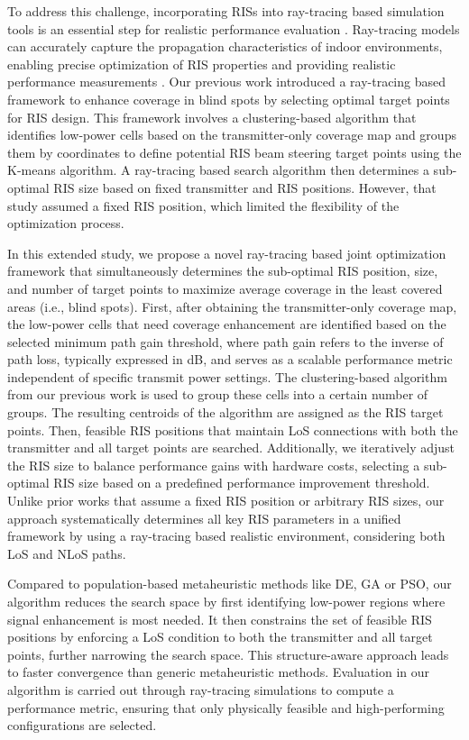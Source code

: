 \documentclass{IEEEoj}
\begin{document}
To address this challenge, incorporating RISs into ray-tracing based simulation tools is an essential step for realistic performance evaluation \cite{RT1}. Ray-tracing models can accurately capture the propagation characteristics of indoor environments, enabling precise optimization of RIS properties and providing realistic performance measurements \cite{RT2,RT3}. Our previous work \cite{emre_claude_eucap_paper} introduced a ray-tracing based framework to enhance coverage in blind spots by selecting optimal target points for RIS design. This framework involves a clustering-based algorithm that identifies low-power cells based on the transmitter-only coverage map and groups them by coordinates to define potential RIS beam steering target points using the K-means algorithm. A ray-tracing based search algorithm then determines a sub-optimal RIS size based on fixed transmitter and RIS positions. However, that study assumed a fixed RIS position, which limited the flexibility of the optimization process.

In this extended study, we propose a novel ray-tracing based joint optimization framework that simultaneously determines the sub-optimal RIS position, size, and number of target points to maximize average coverage in the least covered areas (i.e., blind spots). First, after obtaining the transmitter-only coverage map, the low-power cells that need coverage enhancement are identified based on the selected minimum path gain threshold, where path gain refers to the inverse of path loss, typically expressed in dB, and serves as a scalable performance metric independent of specific transmit power settings. The clustering-based algorithm from our previous work \cite{emre_claude_eucap_paper} is used to group these cells into a certain number of groups. The resulting centroids of the algorithm are assigned as the RIS target points. Then, feasible RIS positions that maintain LoS connections with both the transmitter and all target points are searched. Additionally, we iteratively adjust the RIS size to balance performance gains with hardware costs, selecting a sub-optimal RIS size based on a predefined performance improvement threshold. Unlike prior works that assume a fixed RIS position or arbitrary RIS sizes, our approach systematically determines all key RIS parameters in a unified framework by using a ray-tracing based realistic environment, considering both LoS and NLoS paths.

Compared to population-based metaheuristic methods like DE, GA or PSO, our algorithm reduces the search space by first identifying low-power regions where signal enhancement is most needed. It then constrains the set of feasible RIS positions by enforcing a LoS condition to both the transmitter and all target points, further narrowing the search space. This structure-aware approach leads to faster convergence than generic metaheuristic methods. Evaluation in our algorithm is carried out through ray-tracing simulations to compute a performance metric, ensuring that only physically feasible and high-performing configurations are selected.
\end{document}
